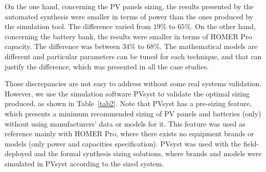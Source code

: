 \documentclass[10pt,journal,compsoc]{IEEEtran}
\begin{document}
On the one hand, concerning the PV panels sizing, the results presented by the automated synthesis were smaller in terms of power than the ones produced by the simulation tool. The difference varied from $19$\% to $65$\%. On the other hand, concerning the battery bank, the results were smaller in terms of HOMER Pro capacity. The difference was between $34$\% to $68$\%. The mathematical models are different and particular parameters can be tuned for each technique, and that can justify the difference, which was presented in all the case studies.

Those discrepancies are not easy to address without some real systems validation. However, we use the simulation software PVsyst to validate the optimal sizing produced, as shown in Table~\ref{tab2}. Note that PVsyst has a pre-sizing feature, which presents a minimum recommended sizing of PV panels and batteries (only) without using manufacturers' data or models for it. This feature was used as reference mainly with HOMER Pro, where there exists no equipment brands or models (only power and capacities specification). PVsyst was used with the field-deployed and the formal synthesis sizing solutions, where brands and models were simulated in PVsyst according to the sized system.
%
\end{document}
